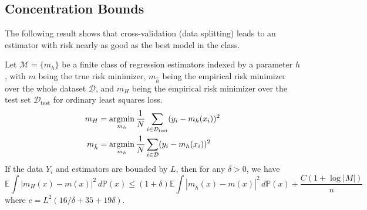 \subsection{Concentration Bounds}

  The following result shows that cross-validation (data splitting) leads to an estimator with risk nearly as good as the best model in the class. 

  \begin{theorem}
    Let $\mathcal{M} = \{m_h\}$ be a finite class of regression estimators indexed by a parameter $h$, with $m$ being the true risk minimizer, $m_{\hat{h}}$ being the empirical risk minimizer over the whole dataset $\mathcal{D}$, and $m_{H}$ being the empirical risk minimizer over the test set $\mathcal{D}_{\mathrm{test}}$ for ordinary least squares loss. 
    \begin{align}
      m_H & = \argmin_{m_h} \frac{1}{N} \sum_{i \in \mathcal{D}_{\mathrm{test}}} (y_i - m_h(x_i))^2 \\ 
      m_{\hat{h}} & = \argmin_{m_h} \frac{1}{N} \sum_{i \in \mathcal{D}} (y_i - m_h(x_i))^2 
    \end{align}
    If the data $Y_i$ and estimators are bounded by $L$, then for any $\delta > 0$, we have 
    \begin{equation}
      \mathbb{E} \int |m_H (x) - m(x)|^2 \,d\mathbb{P}(x) \leq (1 + \delta) \mathbb{E} \int |m_{\hat{h}} (x) - m(x) |^2 \,d \mathbb{P}(x) + \frac{C (1 + \log{|M|})}{n}
    \end{equation}
    where $c = L^2 (16/\delta + 35 + 19\delta)$. 
  \end{theorem}
